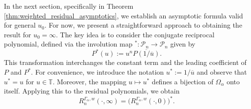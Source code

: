 \documentclass[12pt,oneside,reqno]{amsart}
\theoremstyle{definition}
\numberwithin{equation}{section}
\begin{document}
In the next section, specifically in Theorem \ref{thm:weighted_residual_asymptotics}, we establish an asymptotic formula valid for general \( u_0 \). For now, we present a straightforward approach to obtaining the result for \( u_0 = \infty \).
The key idea is to consider the conjugate reciprocal polynomial, defined via the involution map \( ^\ast: \mathcal{P}_n \to \mathcal{P}_n \) given by  
\[
   P^\ast(u) := u^n \overline{P(1/\overline{u})}.
\]
This transformation interchanges the constant term and the leading coefficient of \( P \) and \( P^* \).  
For convenience, we introduce the notation \( u^\ast := 1/\overline{u} \) and observe that \( u^* = u \) for \( u \in \mathbb{T} \). Moreover, the mapping \( u \mapsto u^* \) defines a bijection of \( \Omega_\alpha \) onto itself. Applying this to the residual polynomials, we obtain  
\begin{equation}
\label{Rn star}
   R_{n}^{\Gamma_\alpha,w}(\cdot,\infty) = \bigl(R_{n}^{\Gamma_\alpha,w}(\cdot,0) \bigr)^\ast.
\end{equation}
\end{document}
